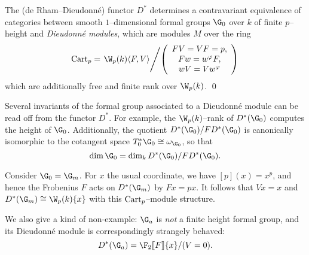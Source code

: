 \begin{theorem}\label{MainContraDieudonneThm}
The (de Rham--Dieudonn\'e) functor \(D^*\) determines a contravariant equivalence of categories between smooth \(1\)--dimensional formal groups \(\G_0\) over \(k\) of finite \(p\)--height and \textit{Dieudonn\'e modules}, which are modules \(M\) over the ring \[\Cart_p = \left. \W_p(k)\<F,V\> \middle/ \left( \begin{array}{c} FV = VF = p, \\ Fw = w^\phi F, \\ wV = Vw^\phi \end{array} \right) \right.\] which are additionally free and finite rank over \(\W_p(k)\). \qed
\end{theorem}

\begin{remark}
Several invariants of the formal group associated to a Dieudonn\'e module can be read off from the functor \(D^*\).  For example, the \(\W_p(k)\)--rank of \(D^*(\G_0)\) computes the height of \(\G_0\).  Additionally, the quotient \(D^*(\G_0) / FD^*(\G_0)\) is canonically isomorphic to the cotangent space \(T_0^* \G_0 \cong \omega_{\G_0}\), so that \[\dim \G_0 = \dim_k D^*(\G_0) / FD^*(\G_0).\]
\end{remark}

\begin{example}
Consider \(\G_0 = \G_m\).  For \(x\) the usual coordinate, we have \([p](x) = x^p\), and hence the Frobenius \(F\) acts on \(D^*(\G_m)\) by \(Fx = px\).  It follows that \(Vx = x\) and \(D^*(\G_m) \cong \W_p(k)\{x\}\) with this \(\mathrm{Cart}_p\)--module structure.
\end{example}

\begin{example}
We also give a kind of non-example: \(\G_a\) is \emph{not} a finite height formal group, and its Dieudonn\'e module is correspondingly strangely behaved: \[D^*(\G_a) = \F_2\ps{F}\{x\} / (V = 0).\]
\end{example}

